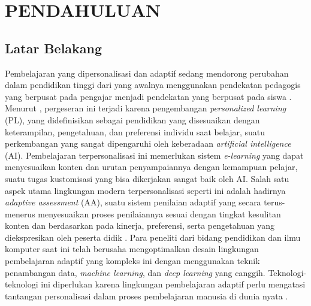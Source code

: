 \documentclass[12pt,a4paper,oneside]{book}
\begin{document}
\captionsetup[figure]{labelsep=space}
\captionsetup[table]{labelsep=space}

\setlength{\parindent}{0pt}
      
\chapter{PENDAHULUAN}

\section{Latar Belakang}
Pembelajaran yang dipersonalisasi dan adaptif sedang mendorong perubahan dalam pendidikan tinggi dari yang awalnya menggunakan pendekatan pedagogis yang berpusat pada pengajar menjadi pendekatan yang berpusat pada siswa \autocite{Ryoo2021}. Menurut \textcite{Halkiopoulos2024}, pergeseran ini terjadi karena pengembangan \textit{personalized learning} (PL), yang didefinisikan sebagai pendidikan yang disesuaikan dengan keterampilan, pengetahuan, dan preferensi individu saat belajar, suatu perkembangan yang sangat dipengaruhi oleh keberadaan \textit{artificial intelligence} (AI). Pembelajaran terpersonalisasi ini memerlukan sistem \textit{e-learning} yang dapat menyesuaikan konten dan urutan penyampaiannya dengan kemampuan pelajar, suatu tugas kustomisasi yang bisa dikerjakan sangat baik oleh AI. Salah satu aspek utama lingkungan modern terpersonalisasi seperti ini adalah hadirnya \textit{adaptive assessment} (AA), suatu sistem penilaian adaptif yang secara terus-menerus menyesuaikan proses penilaiannya sesuai dengan tingkat kesulitan konten dan berdasarkan pada kinerja, preferensi, serta pengetahuan yang diekspresikan oleh peserta didik \autocite{Halkiopoulos2024}. Para peneliti dari bidang pendidikan dan ilmu komputer saat ini telah berusaha mengoptimalkan desain lingkungan pembelajaran adaptif yang kompleks ini dengan menggunakan teknik penambangan data, \textit{machine learning}, dan \textit{deep learning} yang canggih. Teknologi-teknologi ini diperlukan karena lingkungan pembelajaran adaptif perlu mengatasi tantangan personalisasi dalam proses pembelajaran manusia di dunia nyata \autocite{Minn2022}.\\
\end{document}
